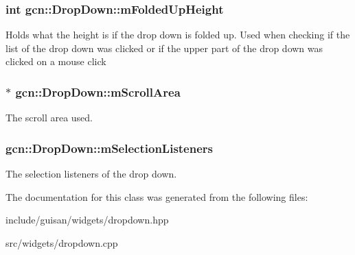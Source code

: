 \subsubsection[{\texorpdfstring{m\+Folded\+Up\+Height}{mFoldedUpHeight}}]{\setlength{\rightskip}{0pt plus 5cm}int gcn\+::\+Drop\+Down\+::m\+Folded\+Up\+Height\hspace{0.3cm}{\ttfamily [protected]}}\hypertarget{classgcn_1_1DropDown_a19582187e93e0c963ce131e4dda76ed0}{}\label{classgcn_1_1DropDown_a19582187e93e0c963ce131e4dda76ed0}
Holds what the height is if the drop down is folded up. Used when checking if the list of the drop down was clicked or if the upper part of the drop down was clicked on a mouse click 
\subsubsection[{\texorpdfstring{m\+Scroll\+Area}{mScrollArea}}]{$\ast$ gcn\+::\+Drop\+Down\+::m\+Scroll\+Area\hspace{0.3cm}{\ttfamily [protected]}}\hypertarget{classgcn_1_1DropDown_ad993ee12246ec45ae933dc0b69120858}{}\label{classgcn_1_1DropDown_ad993ee12246ec45ae933dc0b69120858}
The scroll area used. 
\subsubsection[{\texorpdfstring{m\+Selection\+Listeners}{mSelectionListeners}}]{ gcn\+::\+Drop\+Down\+::m\+Selection\+Listeners\hspace{0.3cm}{\ttfamily [protected]}}\hypertarget{classgcn_1_1DropDown_af75c84f875796ada546de4ee008f165e}{}\label{classgcn_1_1DropDown_af75c84f875796ada546de4ee008f165e}
The selection listener\textquotesingle{}s of the drop down. 

The documentation for this class was generated from the following files\+:\begin{DoxyCompactItemize}
\item 
include/guisan/widgets/dropdown.\+hpp\item 
src/widgets/dropdown.\+cpp\end{DoxyCompactItemize}
